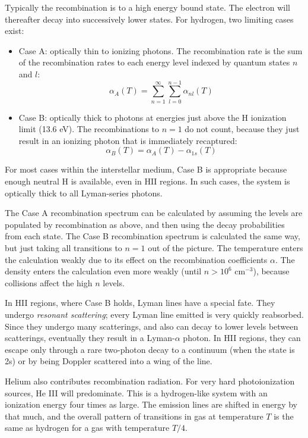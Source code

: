 Typically the recombination is to a high energy bound state. The
electron will thereafter decay into successively lower states. For
hydrogen, two limiting cases exist:
\begin{itemize}
\item Case A: optically thin to ionizing photons. The recombination
  rate is the sum of the recombination rates to each energy level
  indexed by quantum states $n$ and $l$:
  \begin{equation}
    \alpha_A(T) =
    \sum_{n=1}^{\infty} 
    \sum_{l=0}^{n-1} \alpha_{nl}(T)
  \end{equation}
\item Case B: optically thick to photons at energies just above the H
  ionization limit (13.6 eV). The recombinations to $n=1$ do not
  count, because they just result in an ionizing photon that is
  immediately recaptured:
  \begin{equation}
    \alpha_B(T) = \alpha_A(T) - \alpha_{1s} (T)
  \end{equation}
\end{itemize}
For most cases within the interstellar medium, Case B is appropriate
because enough neutral H is available, even in HII regions. In such
cases, the system is optically thick to all Lyman-series photons.

The Case A recombination spectrum can be calculated by assuming the
levels are populated by recombination as above, and then using the
decay probabilities from each state. The Case B recombination spectrum
is calculated the same way, but just taking all transitions to $n=1$
out of the picture. The temperature enters the calculation weakly due
to its effect on the recombination coefficients $\alpha$. The density
enters the calculation even more weakly (until $n>10^6$ cm$^{-3}$),
because collisions affect the high $n$ levels.

In HII regions, where Case B holds, Lyman lines have a special
fate. They undergo {\it resonant scattering}; every Lyman line emitted
is very quickly reabsorbed. Since they undergo many scatterings, and
also can decay to lower levels between scatterings, eventually they
result in a Lyman-$\alpha$ photon. In HII regions, they can escape
only through a rare two-photon decay to a continuum (when the state is
2s) or by being Doppler scattered into a wing of the line. 

Helium also contributes recombination radiation. For very hard
photoionization sources, He III will predominate. This is a
hydrogen-like system with an ionization energy four times as
large. The emission lines are shifted in energy by that much, and the
overall pattern of transitions in gas at temperature $T$ is the same
as hydrogen for a gas with temperature $T/4$.

